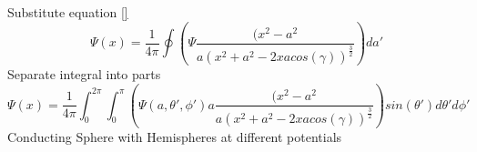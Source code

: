 \documentclass[12pt]{article}
\begin{document}
    Substitute equation \ref{}
    \begin{equation} \label{eq: 10-10-8}
        \Psi(x) = \frac{1}{4 \pi} \oint(\Psi \frac{(x^2 - a^2}{a (x^2 + a^2 - 2 x a cos(\gamma))^{\frac{3}{2}}})da'        
    \end{equation}
    Separate integral into parts
    \begin{equation} \label{eq: 10-10-9}
        \Psi(x) = \frac{1}{4 \pi} \int_0^{2 \pi} \int_0^{\pi}(\Psi(a,\theta',\phi') a \frac{(x^2 - a^2}{a (x^2 + a^2 - 2 x a cos(\gamma))^{\frac{3}{2}}})sin(\theta') d\theta' d\phi'        
    \end{equation}    
    Conducting Sphere with Hemispheres at different potentials
\end{document}
